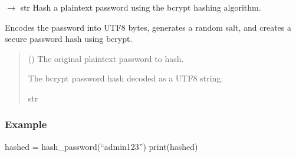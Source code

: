 \documentclass[letterpaper,10pt,english]{sphinxmanual}
\begin{document}
\begin{fulllineitems}
\label{\detokenize{modules:app.security.hash_password}}
\pysigstartsignatures
\pysiglinewithargsret
{}
{}
{{ $\rightarrow$ str}}
\pysigstopsignatures
\sphinxAtStartPar
Hash a plain\sphinxhyphen{}text password using the bcrypt hashing algorithm.

\sphinxAtStartPar
Encodes the password into UTF\sphinxhyphen{}8 bytes, generates a random salt,
and creates a secure password hash using bcrypt.
\begin{quote}\begin{description}
\sphinxAtStartPar
{} () \textendash{} The original plain\sphinxhyphen{}text password to hash.

\sphinxAtStartPar
The bcrypt password hash decoded as a UTF\sphinxhyphen{}8 string.

\sphinxAtStartPar
str

\end{description}\end{quote}
\subsubsection*{Example}

\sphinxAtStartPar
hashed = hash\_password(“admin123”)
print(hashed)

\end{fulllineitems}

\end{document}
